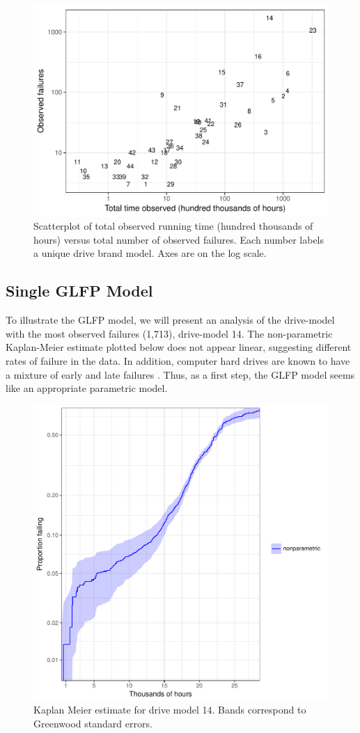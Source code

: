 \documentclass[12pt]{article}
\begin{document}
\begin{figure}[H]
  \includegraphics[width=.9\textwidth]{dm-summ-scatter.pdf}
  \caption{Scatterplot of total observed running time (hundred thousands of hours) versus total number of observed failures.  Each number labels a unique drive brand model.   Axes are on the log scale.}
  \label{fig1}
\end{figure}

\subsection{Single GLFP Model}
\label{subsec:ex1}
To illustrate the GLFP model, we will present an analysis of the drive-model with the most observed failures (1,713), drive-model 14.  The non-parametric Kaplan-Meier estimate plotted below does not appear linear, suggesting different rates of failure in the data. In addition, computer hard drives are known to have a mixture of early and late failures \cite{chan}.  Thus, as a first step, the GLFP model seems like an appropriate parametric model. 

\begin{figure}[H]
\centering
  \includegraphics[width=.8\textwidth]{KM14.pdf}
  \caption{Kaplan Meier estimate for drive model 14.  Bands correspond to Greenwood standard errors.}
  \label{fig1}
\end{figure}
\end{document}
